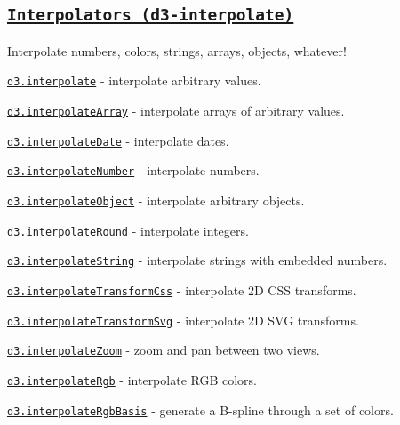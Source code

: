 \subsection*{\href{https://github.com/d3/d3-interpolate}{\tt Interpolators (d3-\/interpolate)}}

Interpolate numbers, colors, strings, arrays, objects, whatever!


\begin{DoxyItemize}
\item \href{https://github.com/d3/d3-interpolate/blob/master/README.md#interpolate}{\tt d3.\+interpolate} -\/ interpolate arbitrary values.
\item \href{https://github.com/d3/d3-interpolate/blob/master/README.md#interpolateArray}{\tt d3.\+interpolate\+Array} -\/ interpolate arrays of arbitrary values.
\item \href{https://github.com/d3/d3-interpolate/blob/master/README.md#interpolateDate}{\tt d3.\+interpolate\+Date} -\/ interpolate dates.
\item \href{https://github.com/d3/d3-interpolate/blob/master/README.md#interpolateNumber}{\tt d3.\+interpolate\+Number} -\/ interpolate numbers.
\item \href{https://github.com/d3/d3-interpolate/blob/master/README.md#interpolateObject}{\tt d3.\+interpolate\+Object} -\/ interpolate arbitrary objects.
\item \href{https://github.com/d3/d3-interpolate/blob/master/README.md#interpolateRound}{\tt d3.\+interpolate\+Round} -\/ interpolate integers.
\item \href{https://github.com/d3/d3-interpolate/blob/master/README.md#interpolateString}{\tt d3.\+interpolate\+String} -\/ interpolate strings with embedded numbers.
\item \href{https://github.com/d3/d3-interpolate/blob/master/README.md#interpolateTransformCss}{\tt d3.\+interpolate\+Transform\+Css} -\/ interpolate 2D C\+SS transforms.
\item \href{https://github.com/d3/d3-interpolate/blob/master/README.md#interpolateTransformSvg}{\tt d3.\+interpolate\+Transform\+Svg} -\/ interpolate 2D S\+VG transforms.
\item \href{https://github.com/d3/d3-interpolate/blob/master/README.md#interpolateZoom}{\tt d3.\+interpolate\+Zoom} -\/ zoom and pan between two views.
\item \href{https://github.com/d3/d3-interpolate/blob/master/README.md#interpolateRgb}{\tt d3.\+interpolate\+Rgb} -\/ interpolate R\+GB colors.
\item \href{https://github.com/d3/d3-interpolate/blob/master/README.md#interpolateRgbBasis}{\tt d3.\+interpolate\+Rgb\+Basis} -\/ generate a B-\/spline through a set of colors.

\end{DoxyItemize}
